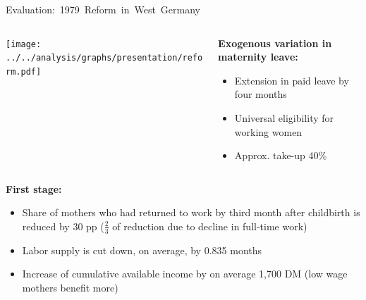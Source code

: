 \documentclass[aspectratio=169,handout]{beamer} %
\begin{document}



\begin{frame}{\mbox{Evaluation: 1979 Reform in West Germany}}



\begin{columns}
	\begin{column}{.6\textwidth}
		\texttt{[image: ../../analysis/graphs/presentation/reform.pdf]}
	\end{column}%
	\begin{column}{.40\textwidth}
		\textbf{Exogenous variation in maternity leave:}\begin{itemize}
		\item Extension in paid leave by four months
		\item Universal eligibility for working women
		\item Approx. take-up 40\%
		
		\end{itemize}
	\end{column}%
	\hfill
	
\normalsize
\end{columns}\pause
\vspace{0.5 em}
\textbf{First stage:}
\begin{itemize}
\item Share of mothers who had returned to work by third month after childbirth is reduced by 30 pp ($\tfrac{2}{3}$ of reduction due to decline in full-time work)	
\item Labor supply is cut down, on average, by 0.835 months
\item Increase of cumulative available income by on average 1,700 DM (low wage mothers benefit more)
\end{itemize}
\end{frame}
		
\end{document}
